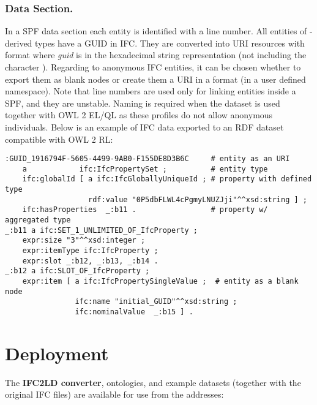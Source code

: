 \subsubsection{Data Section.} In a SPF data section each entity is identified with a line number.
All entities of -derived types have a GUID in IFC. They are converted into URI resources with format  where \emph{guid} is in the hexadecimal string representation (not including the character \name{\$}). Regarding to anonymous IFC entities, it can be chosen whether to export them as blank nodes or create them a URI in a format  (in a user defined namespace). Note that line numbers are used only for linking entities inside a SPF, and they are unstable. Naming is required when the dataset is used together with OWL 2 EL/QL as these profiles do not allow anonymous individuals. Below is an example of IFC data exported to an RDF dataset compatible with OWL 2 RL:

\begin{lstlisting}
:GUID_1916794F-5605-4499-9AB0-F155DE8D3B6C     # entity as an URI
    a            ifc:IfcPropertySet ;          # entity type
    ifc:globalId [ a ifc:IfcGloballyUniqueId ; # property with defined type
                   rdf:value "0P5dbFLWL4cPgmyLNUZJji"^^xsd:string ] ;
    ifc:hasProperties  _:b11 .                 # property w/ aggregated type
_:b11 a ifc:SET_1_UNLIMITED_OF_IfcProperty ;
    expr:size "3"^^xsd:integer ;
    expr:itemType ifc:IfcProperty ;
    expr:slot _:b12, _:b13, _:b14 .
_:b12 a ifc:SLOT_OF_IfcProperty ;
    expr:item [ a ifc:IfcPropertySingleValue ;  # entity as a blank node
                ifc:name "initial_GUID"^^xsd:string ;
                ifc:nominalValue  _:b15 ] .
\end{lstlisting}



\section{Deployment}

The \textbf{IFC2LD converter}, \ifcowl{} ontologies, and example \ifcrdf{} datasets (together with the original IFC files) are available for use from the addresses:

